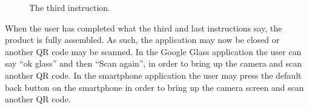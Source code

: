 	\begin{figure}[H]%
		\centering
		\qquad
		\qquad
		\caption{The third instruction.}
		\label{demoCaseInstruction3}
	\end{figure}

When the user has completed what the third and last instructions say, the product is fully assembled. As such, the application may now be closed or another QR code may be scanned. In the Google Glass application the user can say ``ok glass'' and then ``Scan again'', in order to bring up the camera and scan another QR code. In the smartphone application the user may press the default back button on the smartphone in order to bring up the camera screen and scan another QR code.
